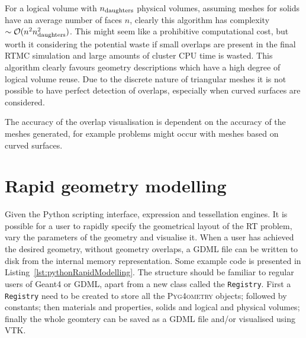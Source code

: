 \documentclass[final,5p,times,twocolumn]{elsarticle}
\newcommand{\PYGEOMETRY}{\textsc{Pyg4ometry}}
\begin{document}
For a logical volume with $n_{\rm daughters}$ physical volumes, assuming meshes for solids have an average number of faces $n$, clearly this algorithm 
has complexity $\sim \mathcal{O}(n^2 n_{\rm daughters}^2)$. This might seem like a prohibitive computational cost, but worth it considering the potential 
waste if small overlaps are present in the final RTMC simulation and large amounts of cluster CPU time is wasted. This algorithm clearly favours geometry descriptions which have a high degree of logical volume reuse. Due to the discrete nature of triangular meshes it is not possible to have perfect detection 
of overlaps, especially when curved surfaces are considered. 

The accuracy of the overlap visualisation is dependent on the accuracy of the meshes generated, for example problems might occur 
with meshes based on curved surfaces.  



\section{Rapid geometry modelling}
Given the Python scripting interface, expression  and tessellation engines. It is possible for a user to rapidly specify the geometrical layout of the RT problem, vary 
the parameters of the geometry and visualise it.  When a user has achieved the desired geometry, without geometry overlaps, a GDML file can be written to disk from the internal memory representation. Some example code is presented in Listing~\ref{lst:pythonRapidModelling}. The structure should be familiar to regular 
users of Geant4 or GDML, apart from a new class called the \lstinline{Registry}. First a \verb|Registry| need to be created to store all the \PYGEOMETRY{} objects; followed by constants;  then materials and properties, solids and logical and physical volumes; finally the whole geomtery can be saved as a GDML file and/or visualised using VTK.
\end{document}
